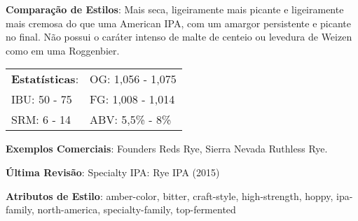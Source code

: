 \textbf{Comparação de Estilos}: Mais seca, ligeiramente mais picante e ligeiramente mais cremosa do que uma American IPA, com um amargor persistente e picante no final. Não possui o caráter intenso de malte de centeio ou levedura de Weizen como em uma Roggenbier.

\begin{tabular}{@{}p{35mm}p{35mm}@{}}
  \textbf{Estatísticas}: & OG: 1,056 - 1,075 \\
  IBU: 50 - 75  & FG: 1,008 - 1,014 \\
  SRM: 6 - 14  & ABV: 5,5\% - 8\%
\end{tabular}

\textbf{Exemplos Comerciais}: Founders Reds Rye, Sierra Nevada Ruthless Rye.

\textbf{Última Revisão}: Specialty IPA: Rye IPA (2015)

\textbf{Atributos de Estilo}: amber-color, bitter, craft-style, high-strength, hoppy, ipa-family, north-america, specialty-family, top-fermented
